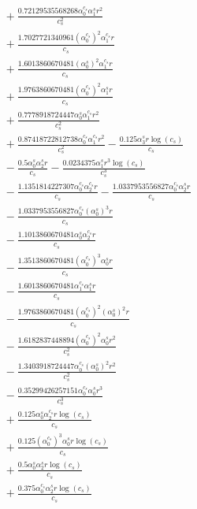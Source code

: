 \documentclass[10pt]{article}
\begin{document}
\begin{align*}
&{}  + \frac{0.72129535568268 \alpha_{0}^{c_s} \alpha_{1}^s r^{2}}{c_{s}^{2}} \\
&{}  + \frac{1.7027721340961 \left(\alpha_{0}^{c_s}\right)^{2} \alpha_{1}^{c_s} r}{c_{s}} \\
&{}  + \frac{1.6013860670481 \left(\alpha_{0}^s\right)^{2} \alpha_{1}^{c_s} r}{c_{s}} \\
&{}  + \frac{1.9763860670481 \left(\alpha_{0}^{c_s}\right)^{2} \alpha_{1}^s r}{c_{s}} \\
&{}  + \frac{0.7778918724447 \alpha_{0}^s \alpha_{1}^{c_s} r^{2}}{c_{s}^{2}} \\
&{}  + \frac{0.87418722812738 \alpha_{0}^{c_s} \alpha_{1}^{c_s} r^{2}}{c_{s}^{2}} - \frac{0.125 \alpha_{3}^s r \log{\left(c_{s} \right)}}{c_{s}} \\
&{}  - \frac{0.5 \alpha_{0}^s \alpha_{2}^s r}{c_{s}} - \frac{0.0234375 \alpha_{1}^s r^{3} \log{\left(c_{s} \right)}}{c_{s}^{3}} \\
&{}  - \frac{1.1351814227307 \alpha_{0}^{c_s} \alpha_{2}^{c_s} r}{c_{s}} - \frac{1.0337953556827 \alpha_{0}^{c_s} \alpha_{2}^s r}{c_{s}} \\
&{}  - \frac{1.0337953556827 \alpha_{0}^{c_s} \left(\alpha_{0}^s\right)^{3} r}{c_{s}} \\
&{}  - \frac{1.1013860670481 \alpha_{0}^s \alpha_{2}^{c_s} r}{c_{s}} \\
&{}  - \frac{1.3513860670481 \left(\alpha_{0}^{c_s}\right)^{3} \alpha_{0}^s r}{c_{s}} \\
&{}  - \frac{1.6013860670481 \alpha_{1}^{c_s} \alpha_{1}^s r}{c_{s}} \\
&{}  - \frac{1.9763860670481 \left(\alpha_{0}^{c_s}\right)^{2} \left(\alpha_{0}^s\right)^{2} r}{c_{s}} \\
&{}  - \frac{1.6182837448894 \left(\alpha_{0}^{c_s}\right)^{2} \alpha_{0}^s r^{2}}{c_{s}^{2}} \\
&{}  - \frac{1.3403918724447 \alpha_{0}^{c_s} \left(\alpha_{0}^s\right)^{2} r^{2}}{c_{s}^{2}} \\
&{}  - \frac{0.35299426257151 \alpha_{0}^{c_s} \alpha_{0}^s r^{3}}{c_{s}^{3}} \\
&{}  + \frac{0.125 \alpha_{0}^s \alpha_{2}^{c_s} r \log{\left(c_{s} \right)}}{c_{s}} \\
&{}  + \frac{0.125 \left(\alpha_{0}^{c_s}\right)^{3} \alpha_{0}^s r \log{\left(c_{s} \right)}}{c_{s}} \\
&{}  + \frac{0.5 \alpha_{0}^s \alpha_{2}^s r \log{\left(c_{s} \right)}}{c_{s}} \\
&{}  + \frac{0.375 \alpha_{0}^{c_s} \alpha_{2}^s r \log{\left(c_{s} \right)}}{c_{s}} \\

\end{align*}
\end{document}
